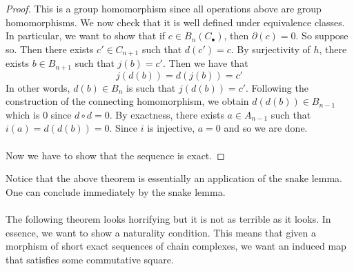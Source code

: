 \documentclass[a4paper]{article}
\begin{document}
\begin{thm}{}{}
\begin{proof}
This is a group homomorphism since all operations above are group homomorphisms. We now check that it is well defined under equivalence classes. In particular, we want to show that if $c\in B_n(C_\bullet)$, then $\partial(c)=0$. So suppose so. Then there exists $c'\in C_{n+1}$ such that $d(c')=c$. By surjectivity of $h$, there exists $b\in B_{n+1}$ such that $j(b)=c'$. Then we have that $$j(d(b))=d(j(b))=c'$$ In other words, $d(b)\in B_n$ is such that $j(d(b))=c'$. Following the construction of the connecting homomorphism, we obtain $d(d(b))\in B_{n-1}$ which is $0$ since $d\circ d=0$. By exactness, there exists $a\in A_{n-1}$ such that $i(a)=d(d(b))=0$. Since $i$ is injective, $a=0$ and so we are done. \\~\\

Now we have to show that the sequence is exact. 
\end{proof}
\end{thm}

Notice that the above theorem is essentially an application of the snake lemma. One can conclude immediately by the snake lemma. \\~\\

The following theorem looks horrifying but it is not as terrible as it looks. In essence, we want to show a naturality condition. This means that given a morphism of short exact sequences of chain complexes, we want an induced map that satisfies some commutative square. 
\end{document}

